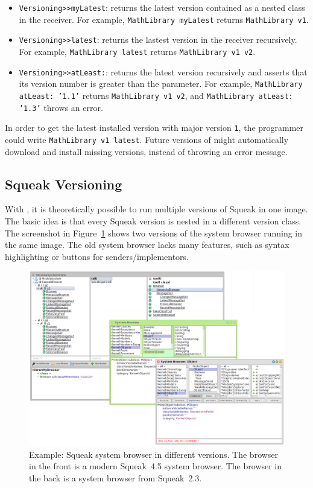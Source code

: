 \begin{itemize}
	\item \texttt{Versioning>>myLatest}: returns the latest version contained as a nested class in the receiver. For example, \texttt{MathLibrary myLatest} returns \texttt{MathLibrary v1}.
	\item \texttt{Versioning>>latest}: returns the lastest version in the receiver recursively. For example, \texttt{MathLibrary latest} returns \texttt{MathLibrary v1 v2}.
	\item \texttt{Versioning>>atLeast:}: returns the latest version recursively and asserts that its version number is greater than the parameter. For example, \texttt{MathLibrary atLeast: '1.1'} returns \texttt{MathLibrary v1 v2}, and \texttt{MathLibrary atLeast: '1.3'} throws an error.
\end{itemize}

In order to get the latest installed version with major version \texttt{1}, the programmer could write \texttt{MathLibrary v1 latest}. Future versions of \msname might automatically download and install missing versions, instead of throwing an error message.

\subsection{Squeak Versioning}
With \msname, it is theoretically possible to run multiple versions of Squeak in one image. The basic idea is that every Squeak version is nested in a different version class. The screenshot in Figure~\ref{fig:usecase_browsers} shows two versions of the system browser running in the same image. The old system browser lacks many features, such as syntax highlighting or buttons for senders/implementors.

\begin{figure}[!htp]
\includegraphics[width=\textwidth]{usecase_browsers.png}
\centering
\caption[Example: Squeak system browser in different versions]{Example: Squeak system browser in different versions. The browser in the front is a modern Squeak~4.5 system browser. The browser in the back is a system browser from Squeak~2.3.}
\label{fig:usecase_browsers}
\end{figure}

